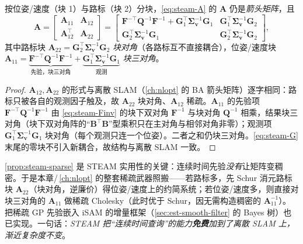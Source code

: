 \begin{proposition}\label{prop:steam-sparse}
按位姿/速度（块 1）与路标（块 2）分块，\cref{eq:steam-A} 的 $\mathbf{A}$ 仍是\emph{箭头矩阵}，且
\begin{equation}
  \mathbf{A}=\begin{bmatrix}\mathbf{A}_{11}&\mathbf{A}_{12}\\\mathbf{A}_{12}^\top&\mathbf{A}_{22}\end{bmatrix}
  =\begin{bmatrix}\mathbf{F}^{-\top}\mathbf{Q}^{-1}\mathbf{F}^{-1}+\mathbf{G}_1^\top\boldsymbol{\Sigma}_{\mathbf{v}}^{-1}\mathbf{G}_1&\mathbf{G}_1^\top\boldsymbol{\Sigma}_{\mathbf{v}}^{-1}\mathbf{G}_2\\\mathbf{G}_2^\top\boldsymbol{\Sigma}_{\mathbf{v}}^{-1}\mathbf{G}_1&\mathbf{G}_2^\top\boldsymbol{\Sigma}_{\mathbf{v}}^{-1}\mathbf{G}_2\end{bmatrix},
  \label{eq:steam-arrow}
\end{equation}
其中路标块 $\mathbf{A}_{22}=\mathbf{G}_2^\top\boldsymbol{\Sigma}_{\mathbf{v}}^{-1}\mathbf{G}_2$ \emph{块对角}（各路标互不直接耦合），位姿/速度块 $\mathbf{A}_{11}=\underbrace{\mathbf{F}^{-\top}\mathbf{Q}^{-1}\mathbf{F}^{-1}}_{\text{先验，块三对角}}+\underbrace{\mathbf{G}_1^\top\boldsymbol{\Sigma}_{\mathbf{v}}^{-1}\mathbf{G}_1}_{\text{观测}}$ \emph{块三对角}。
\end{proposition}
\begin{proof}
$\mathbf{A}_{12},\mathbf{A}_{22}$ 的形式与离散 SLAM（\cref{ch:nlopt} 的 BA 箭头矩阵）逐字相同：路标只被各自的观测因子触及，故 $\mathbf{A}_{22}$ 块对角、$\mathbf{A}_{12}$ 稀疏。$\mathbf{A}_{11}$ 的先验项 $\mathbf{F}^{-\top}\mathbf{Q}^{-1}\mathbf{F}^{-1}$ 由 \cref{eq:steam-Finv} 的块下双对角 $\mathbf{F}^{-1}$ 与块对角 $\mathbf{Q}^{-1}$ 相乘，结果块三对角（块下双对角阵的“$\mathbf{B}^\top\mathbf{B}$”型乘积只在主对角与相邻对角非零）；观测项 $\mathbf{G}_1^\top\boldsymbol{\Sigma}_{\mathbf{v}}^{-1}\mathbf{G}_1$ 块对角（每个观测只连一个位姿）。二者之和仍块三对角。\cref{eq:steam-G} 末尾的零块不引入新耦合，故结构与离散 SLAM 一致。
\end{proof}

\begin{insight}
\cref{prop:steam-sparse} 是 STEAM 实用性的关键：连续时间先验\emph{没有}让矩阵变稠密。于是本章/\,\cref{ch:nlopt} 的整套稀疏武器照搬——若路标多，先 Schur 消元路标块 $\mathbf{A}_{22}$（块对角，逆廉价）得位姿/速度上的约简系统；若位姿/速度多，则直接对块三对角的 $\mathbf{A}_{11}$ 做稀疏 Cholesky（此时优于 Schur，因无需构造稠密的 $\mathbf{A}_{11}^{-1}$）。把稀疏 GP 先验嵌入 iSAM 的增量框架（\cref{sec:est-smooth-filter} 的 Bayes 树）也已实现\cite{anderson2015steam}。一句话：\emph{STEAM 把“连续时间查询”的能力\textbf{免费}加到了离散 SLAM 上，渐近复杂度不变}。
\end{insight}

